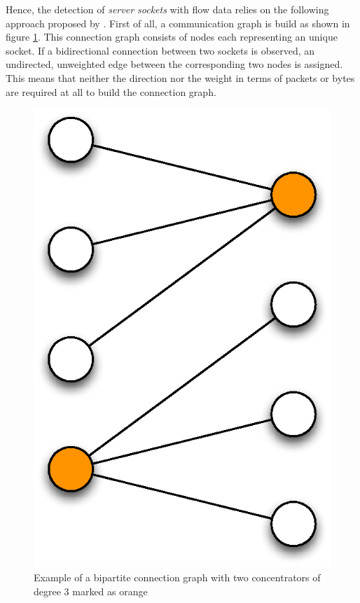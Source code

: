 Hence, the detection of \emph{server sockets} with flow data relies on the following approach proposed by \citet{Schatzmann:Mining,Schatzmann:Dissection, Schatzmann:Tracing}. First of all, a communication graph is build as shown in figure \ref{fig:bipartite_graph}. This connection graph consists of nodes each representing an unique socket. If a bidirectional connection between two sockets is observed, an undirected, unweighted edge between the corresponding two nodes is assigned. This means that neither the direction nor the weight in terms of packets or bytes are required at all to build the connection graph. 
\begin{figure}
	[h] \centering 
	\includegraphics[width=\linewidth/3]{images/connection_graph.eps} \caption{Example of a bipartite connection graph with two concentrators of degree 3 marked as orange} 
	\label{fig:bipartite_graph} 
\end{figure}

